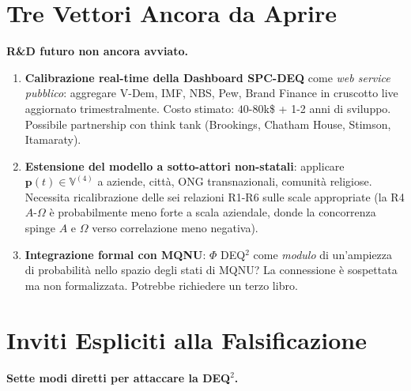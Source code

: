 \section{Tre Vettori Ancora da
Aprire}\label{tre-vettori-ancora-da-aprire}

\Hypoth{} \textbf{R\&D futuro non ancora avviato.}

\begin{enumerate}
\def\labelenumi{\arabic{enumi}.}
\tightlist
\item
  \textbf{Calibrazione real-time della Dashboard SPC-DEQ} come \emph{web
  service pubblico}: aggregare V-Dem, IMF, NBS, Pew, Brand Finance in
  cruscotto live aggiornato trimestralmente. Costo stimato:
  \(40\)-\(80\)k\$ + 1-2 anni di sviluppo. Possibile partnership con
  think tank (Brookings, Chatham House, Stimson, Itamaraty).
\item
  \textbf{Estensione del modello a sotto-attori non-statali}: applicare
  \(\boldsymbol{p}(t) \in \mathbb{V}^{(4)}\) a aziende, città, ONG
  transnazionali, comunità religiose. Necessita ricalibrazione delle sei
  relazioni R1-R6 sulle scale appropriate (la R4 \(A\)-\(\Omega\) è
  probabilmente meno forte a scala aziendale, donde la concorrenza spinge
  \(A\) e \(\Omega\) verso correlazione meno negativa).
\item
  \textbf{Integrazione formal con MQNU}: \(\Phi\) DEQ$^2$ come
  \emph{modulo} di un'ampiezza di probabilità nello spazio degli stati
  di MQNU? La connessione è sospettata ma non formalizzata. Potrebbe
  richiedere un terzo libro.
\end{enumerate}



\section{Inviti Espliciti alla
Falsificazione}\label{inviti-espliciti-alla-falsificación}

\Hypoth{} \textbf{Sette modi diretti per attaccare la DEQ$^2$.}

